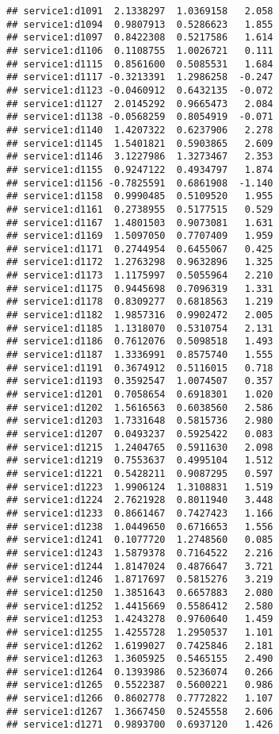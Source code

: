 \documentclass[
]{article}
\begin{document}
\begin{verbatim}
## service1:d1091  2.1338297  1.0369158   2.058
## service1:d1094  0.9807913  0.5286623   1.855
## service1:d1097  0.8422308  0.5217586   1.614
## service1:d1106  0.1108755  1.0026721   0.111
## service1:d1115  0.8561600  0.5085531   1.684
## service1:d1117 -0.3213391  1.2986258  -0.247
## service1:d1123 -0.0460912  0.6432135  -0.072
## service1:d1127  2.0145292  0.9665473   2.084
## service1:d1138 -0.0568259  0.8054919  -0.071
## service1:d1140  1.4207322  0.6237906   2.278
## service1:d1145  1.5401821  0.5903865   2.609
## service1:d1146  3.1227986  1.3273467   2.353
## service1:d1155  0.9247122  0.4934797   1.874
## service1:d1156 -0.7825591  0.6861908  -1.140
## service1:d1158  0.9990485  0.5109520   1.955
## service1:d1161  0.2738955  0.5177515   0.529
## service1:d1167  1.4801503  0.9073081   1.631
## service1:d1169  1.5097050  0.7707409   1.959
## service1:d1171  0.2744954  0.6455067   0.425
## service1:d1172  1.2763298  0.9632896   1.325
## service1:d1173  1.1175997  0.5055964   2.210
## service1:d1175  0.9445698  0.7096319   1.331
## service1:d1178  0.8309277  0.6818563   1.219
## service1:d1182  1.9857316  0.9902472   2.005
## service1:d1185  1.1318070  0.5310754   2.131
## service1:d1186  0.7612076  0.5098518   1.493
## service1:d1187  1.3336991  0.8575740   1.555
## service1:d1191  0.3674912  0.5116015   0.718
## service1:d1193  0.3592547  1.0074507   0.357
## service1:d1201  0.7058654  0.6918301   1.020
## service1:d1202  1.5616563  0.6038560   2.586
## service1:d1203  1.7331648  0.5815736   2.980
## service1:d1207  0.0493237  0.5925422   0.083
## service1:d1215  1.2404765  0.5911630   2.098
## service1:d1219  0.7553637  0.4995104   1.512
## service1:d1221  0.5428211  0.9087295   0.597
## service1:d1223  1.9906124  1.3108831   1.519
## service1:d1224  2.7621928  0.8011940   3.448
## service1:d1233  0.8661467  0.7427423   1.166
## service1:d1238  1.0449650  0.6716653   1.556
## service1:d1241  0.1077720  1.2748560   0.085
## service1:d1243  1.5879378  0.7164522   2.216
## service1:d1244  1.8147024  0.4876647   3.721
## service1:d1246  1.8717697  0.5815276   3.219
## service1:d1250  1.3851643  0.6657883   2.080
## service1:d1252  1.4415669  0.5586412   2.580
## service1:d1253  1.4243278  0.9760640   1.459
## service1:d1255  1.4255728  1.2950537   1.101
## service1:d1262  1.6199027  0.7425846   2.181
## service1:d1263  1.3605925  0.5465155   2.490
## service1:d1264  0.1393986  0.5236074   0.266
## service1:d1265  0.5522387  0.5600221   0.986
## service1:d1266  0.8602778  0.7772822   1.107
## service1:d1267  1.3667450  0.5245558   2.606
## service1:d1271  0.9893700  0.6937120   1.426

\end{verbatim}
\end{document}
